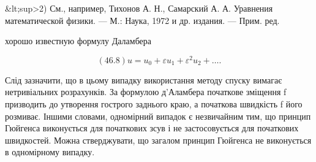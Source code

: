 \documentclass[
  ukrainian,
]{article}
\begin{document}
\&lt;sup\textgreater2) См., например, Тихонов А. Н., Самарский А. А.
Уравнения математической физики. --- М.: Наука, 1972 и др. издания. ---
Прим. ред.

хорошо известную формулу Даламбера

\[
(46.8) u = u_0 + \varepsilon u_1 + \varepsilon^2 u_2 + \dots.
\]

Слід зазначити, що в цьому випадку використання методу спуску вимагає
нетривіальних розрахунків. За формулою д'Аламбера початкове зміщення f
призводить до утворення гострого заднього краю, а початкова швидкість f
його розмиває. Іншими словами, одномірний випадок є незвичайним тим, що
принцип Гюйгенса виконується для початкових зсув і не застосовується для
початкових швидкостей. Можна стверджувати, що загалом принцип Гюйгенса
не виконується в одномірному випадку.
\end{document}
